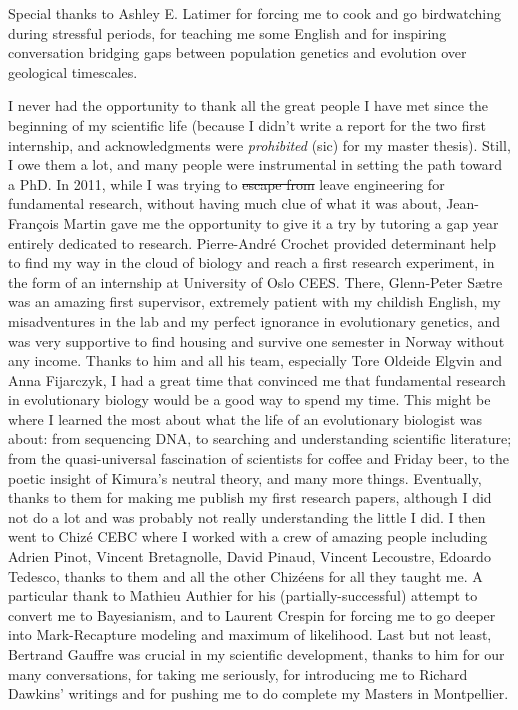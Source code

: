 Special thanks to Ashley E. Latimer for forcing me to cook and go birdwatching during stressful periods, for teaching me some English and for inspiring conversation bridging gaps between population genetics and evolution over geological timescales. 

I never had the opportunity to thank all the great people I have met since the beginning of my scientific life (because I didn't write a report for the two first internship, and acknowledgments were \textit{prohibited} (sic) for my master thesis). Still, I owe them a lot, and many people were instrumental in setting the path toward a PhD. 
In 2011, while I was trying to \sout{escape from} leave engineering for fundamental research, without having much clue of what it was about, Jean-Fran\c{c}ois Martin gave me the opportunity to give it a try by tutoring a gap year entirely dedicated to research. Pierre-Andr\'{e} Crochet provided determinant help to find my way in the cloud of biology and reach a first research experiment, in the form of an internship at University of Oslo CEES. There, Glenn-Peter S{\ae}tre was an amazing first supervisor, extremely patient with my childish English, my misadventures in the lab and my perfect ignorance in evolutionary genetics, and was very supportive to find housing and survive one semester in Norway without any income. Thanks to him and all his team, especially Tore Oldeide Elgvin and Anna Fijarczyk, I had a great time that convinced me that fundamental research in evolutionary biology would be a good way to spend my time. This might be where I learned the most about what the life of an evolutionary biologist was about: from sequencing DNA, to searching and understanding scientific literature; from the quasi-universal fascination of scientists for coffee and Friday beer, to the poetic insight of Kimura's neutral theory, and many more things. Eventually, thanks to them for making me publish my first research papers, although I did not do a lot and was probably not really understanding the little I did. 
I then went to Chiz\'{e} CEBC where I worked with a crew of amazing people including Adrien Pinot, Vincent Bretagnolle, David Pinaud, Vincent Lecoustre, Edoardo Tedesco, thanks to them and all the other Chiz\'eens for all they taught me. A particular thank to Mathieu Authier for his (partially-successful) attempt to convert me to Bayesianism, and to Laurent Crespin for forcing me to go deeper into Mark-Recapture modeling and maximum of likelihood. Last but not least, Bertrand Gauffre was crucial in my scientific development, thanks to him for our many conversations, for taking me seriously, for introducing me to Richard Dawkins' writings and for pushing me to do complete my Masters in Montpellier. 
